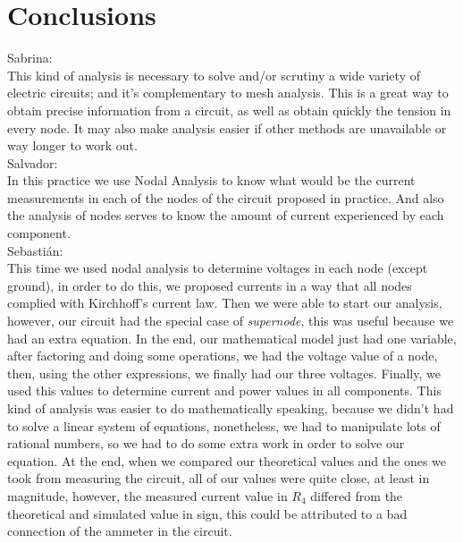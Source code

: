 \documentclass[letterpaper]{article}
\begin{document}
\section{Conclusions}
{\large Sabrina:}\\
This kind of analysis is necessary to solve and/or scrutiny a wide variety of electric
circuits; and it’s complementary to mesh analysis. This is a great way to obtain precise
information from a circuit, as well as obtain quickly the tension in every node. It may
also make analysis easier if other methods are unavailable or way longer to work out.
\\[2ex]
{\large Salvador:}\\
In this practice we use Nodal Analysis to know what would be the current measurements in
each of the nodes of the circuit proposed in practice. And also the analysis of nodes
serves to know the amount of current experienced by each component.
\\[2ex]
{\large Sebastián:}\\
This time we used nodal analysis to determine voltages in each node (except ground), 
in order to do this, we proposed currents in a way that all nodes complied with Kirchhoff's
current law. Then we were able to start our analysis, however, our circuit had the special
case of \textit{supernode}, this was useful because we had an extra equation. In the
end, our mathematical model just had one variable, after factoring and doing some
operations, we had the voltage value of a node, then, using the other expressions, we
finally had our three voltages. Finally, we used this values to determine current and power
values in all components. 
This kind of analysis was easier to do mathematically speaking, because we
didn't had to solve a linear system of equations, nonetheless, we had to manipulate lots
of rational numbers, so we had to do some extra work in order to solve our equation.
At the end, when we compared our theoretical values and the ones we took from measuring the
circuit, all of our values were quite close, at least in magnitude, however, the measured
current value in $R_4$ differed from the theoretical and simulated value in sign, this could be
attributed to a bad connection of the ammeter in the circuit. 
\end{document}
